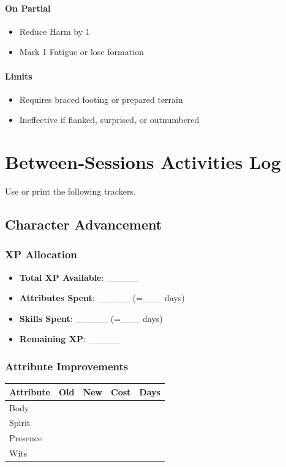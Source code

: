 \paragraph{On Partial}
\begin{itemize}
  \item Reduce Harm by 1
  \item Mark 1 Fatigue or lose formation
\end{itemize}

\paragraph{Limits}
\begin{itemize}
  \item Requires braced footing or prepared terrain
  \item Ineffective if flanked, surprised, or outnumbered
\end{itemize}

\newpage
\section{Between‑Sessions Activities Log}

Use or print the following trackers.

\subsection{Character Advancement}
\subsubsection*{XP Allocation}
\begin{itemize}
  \item \textbf{Total XP Available}: \_\_\_\_\_
  \item \textbf{Attributes Spent}: \_\_\_\_\_ (=\_\_\_ days)
  \item \textbf{Skills Spent}: \_\_\_\_\_ (=\_\_\_ days)
  \item \textbf{Remaining XP}: \_\_\_\_\_
\end{itemize}

\subsubsection*{Attribute Improvements}
\begin{tabular}{|l|c|c|c|c|}
\hline
\textbf{Attribute} & \textbf{Old} & \textbf{New} & \textbf{Cost} & \textbf{Days} \\
\hline
Body & & & & \\
Spirit & & & & \\
Presence & & & & \\
Wits & & & & \\
\hline
\end{tabular}

